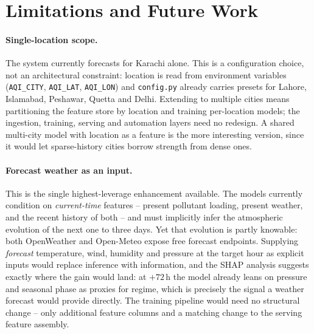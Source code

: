 \documentclass[11pt,a4paper]{article}
\begin{document}
\section{Limitations and Future Work}

\paragraph{Single-location scope.}
The system currently forecasts for Karachi alone. This is a configuration
choice, not an architectural constraint: location is read from environment
variables (\texttt{AQI\_CITY}, \texttt{AQI\_LAT}, \texttt{AQI\_LON}) and
\texttt{config.py} already carries presets for Lahore, Islamabad, Peshawar,
Quetta and Delhi. Extending to multiple cities means partitioning the feature
store by location and training per-location models; the ingestion, training,
serving and automation layers need no redesign. A shared multi-city model with
location as a feature is the more interesting version, since it would let
sparse-history cities borrow strength from dense ones.

\paragraph{Forecast weather as an input.}
This is the single highest-leverage enhancement available. The models currently
condition on \emph{current-time} features -- present pollutant loading, present
weather, and the recent history of both -- and must implicitly infer the
atmospheric evolution of the next one to three days. Yet that evolution is
partly knowable: both OpenWeather and Open-Meteo expose free forecast
endpoints. Supplying \emph{forecast} temperature, wind, humidity and pressure
at the target hour as explicit inputs would replace inference with information,
and the SHAP analysis suggests exactly where the gain would land: at $+72$\,h
the model already leans on pressure and seasonal phase as proxies for regime,
which is precisely the signal a weather forecast would provide directly. The
training pipeline would need no structural change -- only additional feature
columns and a matching change to the serving feature assembly.
\end{document}
